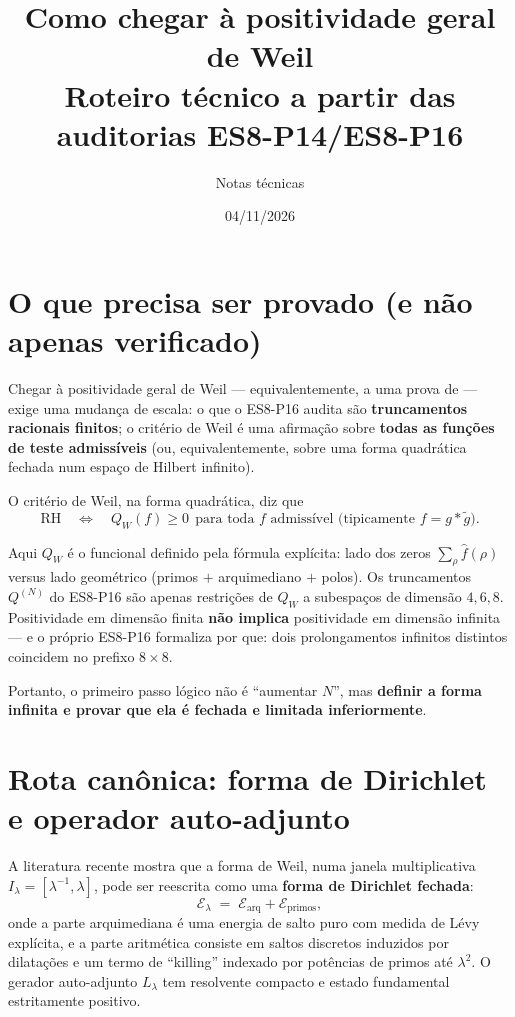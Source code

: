\documentclass[11pt,a4paper]{article}
\title{Como chegar à positividade geral de Weil\\[2pt]
\large Roteiro técnico a partir das auditorias ES8-P14/ES8-P16}
\author{Notas técnicas}
\date{04/11/2026}
\theoremstyle{definition}
\theoremstyle{remark}
\newcommand{\E}{\mathcal{E}}
\newcommand{\RH}{\mathrm{RH}}
\begin{document}
\maketitle

\tableofcontents

\section{O que precisa ser provado (e não apenas verificado)}

Chegar à positividade geral de Weil --- equivalentemente, a uma prova de
\RH{} --- exige uma mudança de escala: o que o ES8-P16 audita são
\textbf{truncamentos racionais finitos}; o critério de Weil é uma afirmação
sobre \textbf{todas as funções de teste admissíveis} (ou, equivalentemente,
sobre uma forma quadrática fechada num espaço de Hilbert infinito).

O critério de Weil, na forma quadrática, diz que
\[
\RH \quad\Longleftrightarrow\quad
Q_W(f)\ge 0
\ \ \text{para toda } f \text{ admissível (tipicamente } f=g*\tilde g\text{)}.
\]

Aqui \(Q_W\) é o funcional definido pela fórmula explícita: lado dos zeros
\(\sum_\rho \hat f(\rho)\) versus lado geométrico (primos \(+\) arquimediano
\(+\) polos). Os truncamentos \(Q^{(N)}\) do ES8-P16 são apenas restrições de
\(Q_W\) a subespaços de dimensão \(4,6,8\). Positividade em dimensão finita
\textbf{não implica} positividade em dimensão infinita --- e o próprio ES8-P16
formaliza por que: dois prolongamentos infinitos distintos coincidem no
prefixo \(8\times 8\).

Portanto, o primeiro passo lógico não é ``aumentar \(N\)'', mas
\textbf{definir a forma infinita e provar que ela é fechada e limitada
inferiormente}.

\section{Rota canônica: forma de Dirichlet e operador auto-adjunto}

A literatura recente mostra que a forma de Weil, numa janela multiplicativa
\(I_\lambda=[\lambda^{-1},\lambda]\), pode ser reescrita como uma
\textbf{forma de Dirichlet fechada}:
\[
\E_\lambda \;=\; \E_{\text{arq}} + \E_{\text{primos}},
\]
onde a parte arquimediana é uma energia de salto puro com medida de Lévy
explícita, e a parte aritmética consiste em saltos discretos induzidos por
dilatações e um termo de ``killing'' indexado por potências de primos até
\(\lambda^2\). O gerador auto-adjunto \(L_\lambda\) tem resolvente compacto e
estado fundamental estritamente positivo.
\end{document}
